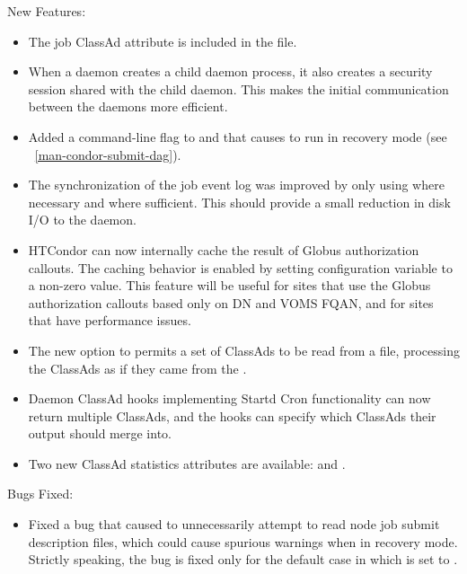 \noindent New Features:

\begin{itemize}

\item The job ClassAd attribute  is included in 
the  file.

\item When a daemon creates a child daemon process, it also creates a
security session shared with the child daemon.
This makes the initial communication between the daemons more efficient.

\item Added a  command-line flag to 
and  that causes  to run in
recovery mode (see ~\ref{man-condor-submit-dag}).

\item The synchronization of the job event log was improved by only
using  where necessary and 
 where sufficient.  
This should provide a small reduction in disk I/O to 
the  daemon.

\item HTCondor can now internally cache the result of Globus authorization
callouts.  
The caching behavior is enabled by setting configuration variable
 to a non-zero value.
This feature will be useful for sites that use the Globus authorization
callouts based only on DN and VOMS FQAN, and for sites that have 
performance issues.

\item The new  option to  permits a set of ClassAds
to be read from a file, processing the ClassAds as if they came from
the .

\item Daemon ClassAd hooks implementing Startd Cron functionality  
can now return multiple ClassAds,
and the hooks can specify which ClassAds their output should merge into.

\item Two new  ClassAd statistics attributes are
available:  and .

\end{itemize}

\noindent Bugs Fixed:

\begin{itemize}

\item Fixed a bug that caused  to unnecessarily attempt
to read node job submit description files, 
which could cause spurious warnings when in recovery mode.
Strictly speaking, the bug is fixed only for the
default case in which  is set
to .

\end{itemize}

